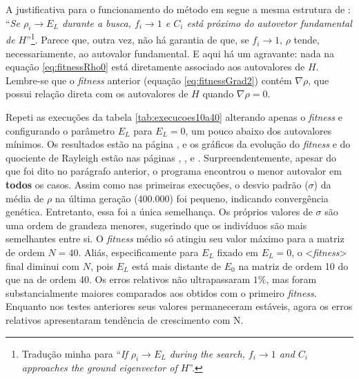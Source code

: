	 A justificativa para o funcionamento do método em \cite{metodo2011} segue a mesma estrutura de \cite{metodo2004}: ``\textit{Se $\rho_i \rightarrow E_L$ durante a busca, $f_i \rightarrow 1$ e $C_i$ está próximo do autovetor fundamental de $H$}''\footnote{Tradução minha para ``\textit{If $\rho_i \rightarrow E_L$ during the search, $f_i \rightarrow 1$ and $C_i$ approaches the ground eigenvector of $H$}''.}. Parece que, outra vez, não há garantia de que, se $f_i \rightarrow 1$, $\rho$ tende, necessariamente, ao autovalor fundamental. E aqui há um agravante: nada na equação \ref{eq:fitnessRho0} está diretamente associado aos autovalores de $H$. Lembre-se que o \textit{fitness} anterior (equação \ref{eq:fitnessGrad2}) contém $\nabla \rho$, que possui relação direta com os autovalores de $H$ quando $\nabla \rho = 0$.
	
	Repeti as execuções da tabela \ref{tab:execucoes10a40} alterando apenas o \textit{fitness} e configurando o parâmetro $E_L$ para $E_L = 0$, um pouco abaixo dos autovalores mínimos. Os resultados estão na página \pageref{tab:execucoesNovoFitness}, e os gráficos da evolução do \textit{fitness} e do quociente de Rayleigh estão nas páginas \pageref{fig:execucoes_N10_EL}, \pageref{fig:execucoes_N20_EL}, \pageref{fig:execucoes_N30_EL} e \pageref{fig:execucoes_N40_EL}. Surpreendentemente, apesar do que foi dito no parágrafo anterior, o programa encontrou o menor autovalor em \textbf{todos} os casos. Assim como nas primeiras execuções, o desvio padrão ($\sigma$) da média de $\rho$ na última geração (400.000) foi pequeno, indicando convergência genética. Entretanto, essa foi a única semelhança. Os próprios valores de $\sigma$ são uma ordem de grandeza menores, sugerindo que os indivíduos são mais semelhantes entre si. O \textit{fitness} médio só atingiu seu valor máximo para a matriz de ordem $N = 40$. Aliás, especificamente para $E_L$ fixado em $E_L = 0$, o <\textit{fitness}> final diminui com $N$, pois $E_L$ está mais distante de $E_0$ na matriz de ordem 10 do que na de ordem 40. Os erros relativos não ultrapassaram $1\%$, mas foram substancialmente maiores comparados aos obtidos com o primeiro \textit{fitness}. Enquanto nos testes anteriores seus valores permaneceram estáveis, agora os erros relativos apresentaram tendência de crescimento com N.
	
